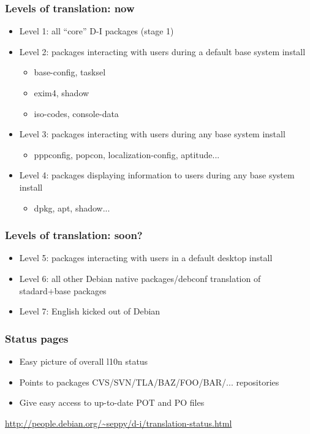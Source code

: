 \documentclass{beamer}
\begin{document}
\begin{frame}
  \frametitle{Levels of translation: now}
	\begin{itemize}
	\item
		Level 1: all ``core'' D-I packages (stage 1)
	\item
		Level 2: packages interacting with users during a default base system install
		\begin{itemize}
			\item
				base-config, tasksel
			\item
				exim4, shadow
			\item
				iso-codes, console-data
		\end{itemize}
	\item
		Level 3: packages interacting with users during any base system install
		\begin{itemize}
			\item
				pppconfig, popcon, localization-config, aptitude...
		\end{itemize}
		\item
			Level 4: packages displaying information to users during any base system install
		\begin{itemize}
			\item
				dpkg, apt, shadow...
		\end{itemize}
	\end{itemize}
\end{frame}

\begin{frame}
  \frametitle{Levels of translation: soon?}
	\begin{itemize}
	\item
		Level 5: packages interacting with users in a default desktop install
	\item
		Level 6: all other Debian native packages/debconf translation of stadard+base packages
	\item
		Level 7: English kicked out of Debian
	\end{itemize}
\end{frame}

\begin{frame}
  \frametitle{Status pages}
	\begin{itemize}
	\item
		Easy picture of overall l10n status 
	\item
		Points to packages CVS/SVN/TLA/BAZ/FOO/BAR/... repositories
	\item
		Give easy access to up-to-date POT and PO files
	\end{itemize}

\url{http://people.debian.org/~seppy/d-i/translation-status.html}

\end{frame}
\end{document}
